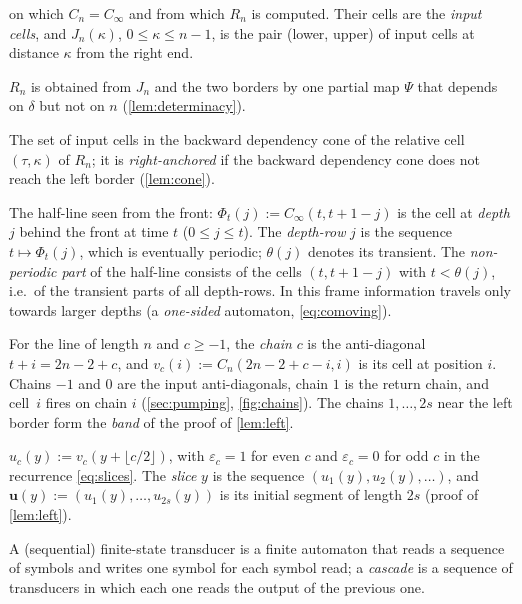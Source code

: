 {\begin{description}[style=unboxed,leftmargin=1em,font=\normalfont\bfseries,itemsep=1pt,parsep=0pt,topsep=2pt]
  on which $C_n=C_\infty$ and from which $R_n$ is computed. Their cells are
  the \emph{input cells}, and $J_n(\kappa)$, $0\le\kappa\le n-1$, is the
  pair (lower, upper) of input cells at distance $\kappa$ from the right
  end.
\item[Determinacy; $\Psi$.] $R_n$ is obtained from $J_n$ and the two
  borders by one partial map $\Psi$ that depends on $\delta$ but not on
  $n$ (\cref{lem:determinacy}).
\item[Cone $\mathrm{cone}_n(\tau,\kappa)$; right-anchored.] The set of
  input cells in the backward dependency cone of the relative cell
  $(\tau,\kappa)$ of $R_n$; it is \emph{right-anchored} if the backward
  dependency cone does not reach the left border
  (\cref{lem:cone}).
\item[Co-moving frame; depth; $\Phi_t(j)$; depth-row.] The half-line seen
  from the front: $\Phi_t(j):=C_\infty(t,t+1-j)$ is the cell at
  \emph{depth} $j$ behind the front at time $t$ ($0\le j\le t$). The
  \emph{depth-row} $j$ is the sequence $t\mapsto\Phi_t(j)$, which is
  eventually periodic; $\theta(j)$ denotes its transient. The
  \emph{non-periodic part} of the half-line consists of the cells
  $(t,t+1-j)$ with $t<\theta(j)$, i.e.\ of the transient parts of all
  depth-rows. In this frame information travels only towards larger depths
  (a \emph{one-sided} automaton, \eqref{eq:comoving}).
\item[Chains $v_c(i)$.] For the line of length $n$ and $c\ge-1$, the
  \emph{chain} $c$ is the anti-diagonal $t+i=2n-2+c$, and
  $v_c(i):=C_n(2n-2+c-i,i)$ is its cell at position $i$. Chains $-1$ and
  $0$ are the input anti-diagonals, chain $1$ is the return chain, and
  cell~$i$ fires on chain $i$ (\cref{sec:pumping}, \cref{fig:chains}). The
  chains $1,\dots,2s$ near the left border form the \emph{band} of the
  proof of \cref{lem:left}.
\item[Skewed coordinates $u_c(y)$; slice.] $u_c(y):=v_c(y+\lfloor
  c/2\rfloor)$, with $\varepsilon_c=1$ for even $c$ and $\varepsilon_c=0$
  for odd $c$ in the recurrence \eqref{eq:slices}. The \emph{slice} $y$ is
  the sequence $(u_1(y),u_2(y),\dots)$, and $\mathbf
  u(y):=(u_1(y),\dots,u_{2s}(y))$ is its initial segment of length $2s$
  (proof of \cref{lem:left}).
\item[Finite-state transducer; cascade.] A (sequential) finite-state
  transducer is a finite automaton that reads a sequence of symbols and
  writes one symbol for each symbol read; a \emph{cascade} is a sequence
  of transducers in which each one reads the output of the previous one.

\end{description}}
